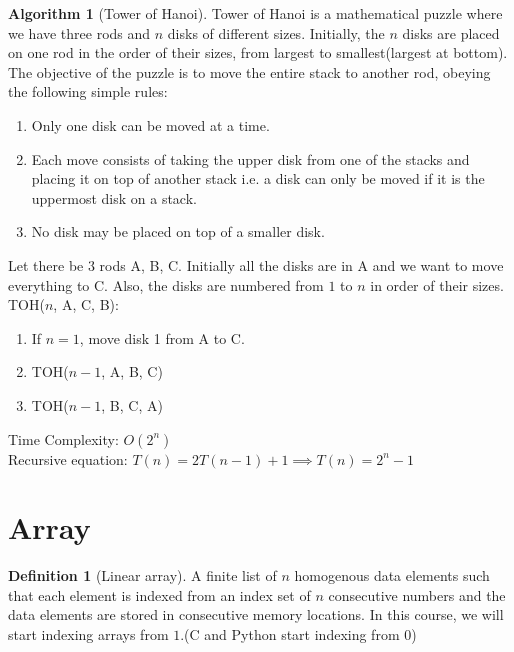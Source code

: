 \documentclass[10pt, a4paper]{extarticle}
\theoremstyle{definition}
\newtheorem{alg}{Algorithm}
\newtheorem{defn}{Definition}
\begin{document}
	\begin{alg}[Tower of Hanoi]
		Tower of Hanoi is a mathematical puzzle where we have three rods and $n$ disks of different sizes. Initially, the $n$ disks are placed on one rod in the order of their sizes, from largest to smallest(largest at bottom). The objective of the puzzle is to move the entire stack to another rod, obeying the following simple rules: 
		\begin{enumerate}
			\item Only one disk can be moved at a time.
			\item Each move consists of taking the upper disk from one of the stacks and placing it on top of another stack i.e. a disk can only be moved if it is the uppermost disk on a stack.
			\item No disk may be placed on top of a smaller disk.
	\end{enumerate}
	Let there be $3$ rods A, B, C. Initially all the disks are in A and we want to move everything to C. Also, the disks are numbered from $1$ to $n$ in order of their sizes.\\
	TOH($n$, A, C, B):
	\begin{enumerate}
		\item If $n=1$, move disk 1 from A to C.
		\item TOH($n-1$, A, B, C)
		\item TOH($n-1$, B, C, A)
\end{enumerate}
	Time Complexity: $O(2^n)$\\
	Recursive equation: $T(n)=2T(n-1)+1\implies T(n)=2^n-1$
	\end{alg}

	\section{Array}
	\begin{defn}[Linear array]
		A finite list of $n$ homogenous data elements such that each element is indexed from an index set of $n$ consecutive numbers and the data elements are stored in consecutive memory locations.
		In this course, we will start indexing arrays from $1$.(C and Python start indexing from 0)
	\end{defn}
\end{document}
